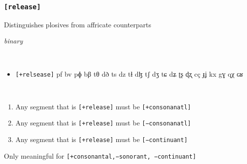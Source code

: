 \documentclass[10pt,letterpaper]{article}
\begin{document}
\subsubsection{\texttt{[release]}}
\label{ssub:feature_release}
\begin{samepage}
\begin{description}
\itemsep1pt \parskip0pt  
\item[Descritpion] Distinguishes plosives from affricate counterparts
\item[Type] \emph{binary}
\item[Examples]\
  \begin{itemize}
    \item \texttt{[+relsease]}
    pf bv pɸ bβ tθ dð ts dz tɬ dɮ tʃ dʒ tɕ dʑ ʈʂ ɖʐ cç ɟʝ kx gɣ qχ ɢʁ
  \end{itemize}
\item[Constraints]\
  \begin{enumerate}
  \itemsep1pt \parskip0pt  
    \item Any segment that is \texttt{[+release]} must be \texttt{[+consonanatl]}
    \item Any segment that is \texttt{[+release]} must be \texttt{[−consonanatl]}
    \item Any segment that is \texttt{[+release]} must be \texttt{[−continuant]}
  \end{enumerate}
\item[Resctrictions] Only meaningful for \texttt{[+consonantal,−sonorant, −continuant]}
\end{description}
\end{samepage}
\end{document}
